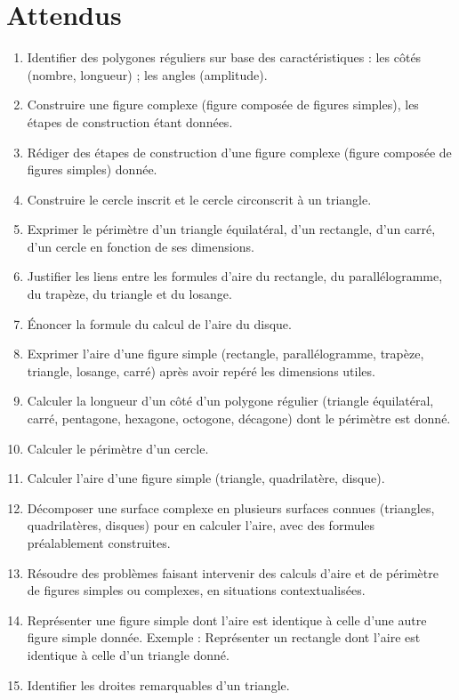 \documentclass[../../syllabus_1.tex]{subfiles}
\begin{document}
\section*{Attendus}
\begin{enumerate}[label=\textbf{\arabic*.}]
    \item Identifier des polygones réguliers sur base des caractéristiques : les côtés (nombre, longueur) ; les angles (amplitude).
    \item Construire une figure complexe (figure composée de figures simples), les étapes de construction étant données.
    \item Rédiger des étapes de construction d'une figure complexe (figure composée de figures simples) donnée.
    \item Construire le cercle inscrit et le cercle circonscrit à un triangle.
    \item Exprimer le périmètre d'un triangle équilatéral, d'un rectangle, d'un carré, d'un cercle en fonction de ses dimensions.
    \item Justifier les liens entre les formules d'aire du rectangle, du parallélogramme, du trapèze, du triangle et du losange.
    \item Énoncer la formule du calcul de l'aire du disque.
    \item Exprimer l'aire d'une figure simple (rectangle, parallélogramme, trapèze, triangle, losange, carré) après avoir repéré les dimensions utiles.
    \item Calculer la longueur d'un côté d'un polygone régulier (triangle équilatéral, carré, pentagone, hexagone, octogone, décagone) dont le périmètre est donné.
    \item Calculer le périmètre d'un cercle.
    \item Calculer l'aire d'une figure simple (triangle, quadrilatère, disque).
    \item Décomposer une surface complexe en plusieurs surfaces connues (triangles, quadrilatères, disques) pour en calculer l'aire, avec des formules préalablement construites.
    \item Résoudre des problèmes faisant intervenir des calculs d'aire et de périmètre de figures simples ou complexes, en situations contextualisées.
    \item Représenter une figure simple dont l'aire est identique à celle d'une autre figure simple donnée. Exemple : Représenter un rectangle dont l'aire est identique à celle d'un triangle donné.
    \item Identifier les droites remarquables d'un triangle.

\end{enumerate}
\end{document}
